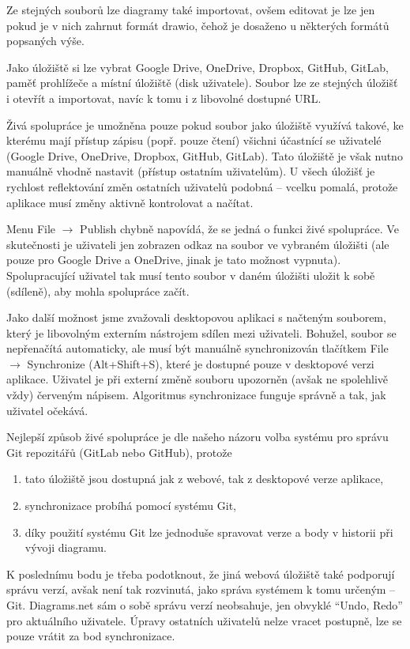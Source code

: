 Ze stejných souborů lze diagramy také importovat, ovšem editovat je lze jen
pokud je v nich zahrnut formát drawio, čehož je dosaženo u některých formátů
popsaných výše.

Jako úložiště si lze vybrat Google Drive, OneDrive, Dropbox, GitHub, GitLab,
paměť prohlížeče a místní úložiště (disk uživatele). Soubor lze ze stejných
úložišť i otevřít a importovat, navíc k tomu i z libovolné dostupné URL.

Živá spolupráce je umožněna pouze pokud soubor jako úložiště využívá takové, ke
kterému mají přístup zápisu (popř. pouze čtení) všichni účastnící se uživatelé
(Google Drive, OneDrive, Dropbox, GitHub, GitLab). Tato úložiště je však nutno
manuálně vhodně nastavit (přístup ostatním uživatelům). U všech úložišť je
rychlost reflektování změn ostatních uživatelů podobná -- vcelku pomalá, protože
aplikace musí změny aktivně kontrolovat a načítat.

Menu File $\rightarrow$ Publish chybně napovídá, že se jedná o funkci živé
spolupráce. Ve skutečnosti je uživateli jen zobrazen odkaz na soubor ve vybraném
úložišti (ale pouze pro Google Drive a OneDrive, jinak je tato možnost vypnuta).
Spolupracující uživatel tak musí tento soubor v daném úložišti uložit k sobě
(sdíleně), aby mohla spolupráce začít. 

Jako další možnost jsme zvažovali desktopovou aplikaci s načteným souborem,
který je libovolným externím nástrojem sdílen mezi uživateli. Bohužel, soubor se
nepřenačítá automaticky, ale musí být manuálně synchronizován tlačítkem File
$\rightarrow$ Synchronize (Alt+Shift+S), které je dostupné pouze v desktopové
verzi aplikace. Uživatel je při externí změně souboru upozorněn (avšak ne
spolehlivě vždy) červeným nápisem. Algoritmus synchronizace funguje správně a
tak, jak uživatel očekává.

Nejlepší způsob živé spolupráce je dle našeho názoru volba systému pro správu
Git repozitářů (GitLab nebo GitHub), protože
\begin{enumerate}
  \item tato úložiště jsou dostupná jak z webové, tak z desktopové verze
  aplikace,
  \item synchronizace probíhá pomocí systému Git,
  \item díky použití systému Git lze jednoduše spravovat verze a body v historii
  při vývoji diagramu.
\end{enumerate} 

K poslednímu bodu je třeba podotknout, že jiná webová úložiště také podporují
správu verzí, avšak není tak rozvinutá, jako správa systémem k tomu určeným --
Git. Diagrams.net sám o sobě správu verzí neobsahuje, jen obvyklé ``Undo, Redo''
pro aktuálního uživatele. Úpravy ostatních uživatelů nelze vracet postupně, lze
se pouze vrátit za bod synchronizace.


